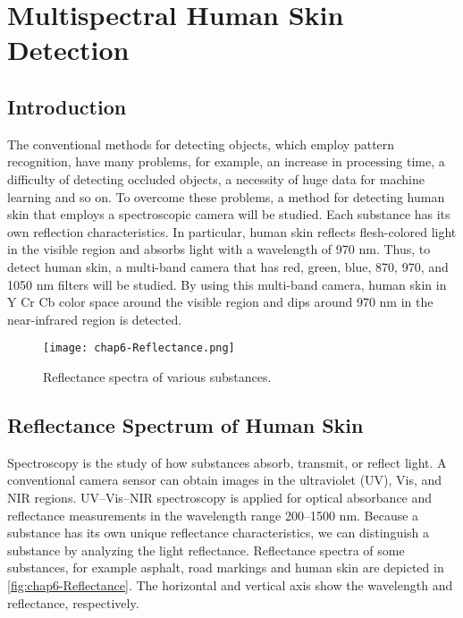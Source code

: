 \chapter{Multispectral Human Skin Detection}%

\label{Chapter6} %


\section{Introduction}
The conventional methods for detecting objects, which employ pattern
recognition, have many problems, for example, an increase in processing time, 
a difficulty of detecting occluded objects, a necessity of huge data for machine
learning and so on. To overcome these problems, a method for detecting human skin 
that employs a spectroscopic camera will be studied. Each substance has its
own reflection characteristics. In particular, human
skin reflects flesh-colored light in the visible region and
absorbs light with a wavelength of 970 nm. Thus, to detect human skin, 
a multi-band camera that has red, green, blue, 870, 970, and 1050 nm filters will be
studied. By using this multi-band camera, human
skin in Y Cr Cb color space around the visible region
and dips around 970 nm in the near-infrared region is detected.\cite{Kanzawa_humanskin}

\begin{figure}[ht]
  \label{fig:chap6-Reflectance}
  \centering
	\texttt{[image: chap6-Reflectance.png]}
	\caption{Reflectance spectra of various substances.}
\end{figure}

\section {Reflectance Spectrum of Human Skin}
Spectroscopy is the study of how substances absorb,
transmit, or reflect light. A conventional camera sensor
can obtain images in the ultraviolet (UV),
Vis, and NIR regions. UV–Vis–NIR spectroscopy is
applied for optical absorbance and reflectance measurements in the wavelength 
range 200–1500 nm. Because a substance has its own unique reflectance 
characteristics, we can distinguish a substance by analyzing the
light reflectance. Reflectance spectra of some substances, for example
asphalt, road markings and human skin are depicted in \autoref {fig:chap6-Reflectance}. 
The horizontal and vertical axis show the wavelength and reflectance, respectively.

